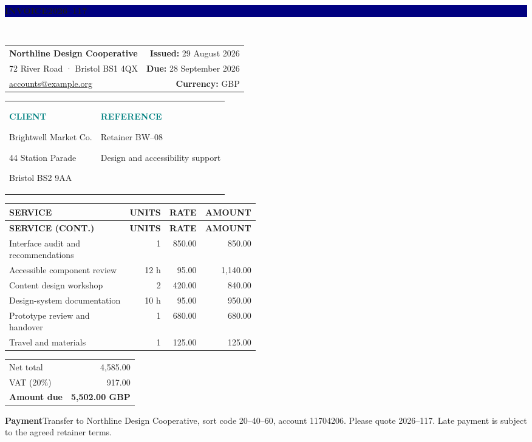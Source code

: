 \documentclass[a4paper]{article}
\begin{document}
\noindent\colorbox{navy}{\parbox{\dimexpr\linewidth-2\fboxsep\relax}{\color{white}\sffamily\Large\bfseries INVOICE\hfill\normalsize 2026--117}}\\[12pt]
\begin{tabularx}{\linewidth}{@{}Xr@{}}
  {\Large\bfseries Northline Design Cooperative} & \textbf{Issued:} 29 August 2026\\
  72 River Road · Bristol BS1 4QX & \textbf{Due:} 28 September 2026\\
  \href{mailto:accounts@example.org}{accounts@example.org} & \textbf{Currency:} GBP
\end{tabularx}
\vspace{15pt}
\begin{tabularx}{\linewidth}{@{}X X@{}}
  \textcolor{teal}{\textbf{CLIENT}}\par Brightwell Market Co.\par 44 Station Parade\par Bristol BS2 9AA
  &
  \textcolor{teal}{\textbf{REFERENCE}}\par Retainer BW--08\par Design and accessibility support
\end{tabularx}
\vspace{13pt}
\begin{longtable}{@{}>{\raggedright\arraybackslash}p{0.48\linewidth}r r r@{}}
\rowcolor{navy}\color{white}\textbf{SERVICE} & \color{white}\textbf{UNITS} & \color{white}\textbf{RATE} & \color{white}\textbf{AMOUNT}\\
\endfirsthead
\rowcolor{navy}\color{white}\textbf{SERVICE (CONT.)} & \color{white}\textbf{UNITS} & \color{white}\textbf{RATE} & \color{white}\textbf{AMOUNT}\\
\endhead
  Interface audit and recommendations & 1 & 850.00 & 850.00\\
  Accessible component review & 12 h & 95.00 & 1,140.00\\
  Content design workshop & 2 & 420.00 & 840.00\\
  Design-system documentation & 10 h & 95.00 & 950.00\\
  Prototype review and handover & 1 & 680.00 & 680.00\\
  Travel and materials & 1 & 125.00 & 125.00\\
  \bottomrule
\end{longtable}
\begin{flushright}\begin{tabular}{lr}
  Net total & 4,585.00\\ VAT (20\%) & 917.00\\
  \toprule \Large\textbf{Amount due} & \Large\textbf{5,502.00 GBP}
\end{tabular}\end{flushright}
\vfill
\noindent\colorbox{bluegray}{\parbox{\dimexpr\linewidth-2\fboxsep\relax}{\textbf{Payment}\quad Transfer to Northline Design Cooperative, sort code 20--40--60, account 11704206. Please quote 2026--117. Late payment is subject to the agreed retainer terms.}}
\end{document}
